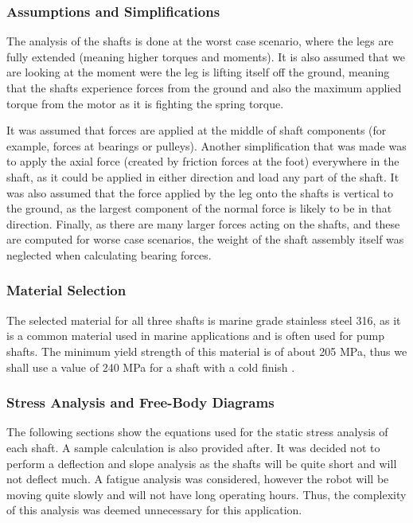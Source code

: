 \subsubsection{Assumptions and Simplifications}

The analysis of the shafts is done at the worst case scenario, where the legs are fully extended (meaning higher torques and moments). It is also assumed that we are looking at the moment were the leg is lifting itself off the ground, meaning that the shafts experience forces from the ground and also the maximum applied torque from the motor as it is fighting the spring torque.

It was assumed that forces are applied at the middle of shaft components (for example, forces at bearings or pulleys). 
Another simplification that was made was to apply the axial force (created by friction forces at the foot) everywhere in the shaft, as it could be applied in either direction and load any part of the shaft.
It was also assumed that the force applied by the leg onto the shafts is vertical to the ground, as the largest component of the normal force is likely to be in that direction.
Finally, as there are many larger forces acting on the shafts, and these are computed for worse case scenarios, the weight of the shaft assembly itself was neglected when calculating bearing forces.


\subsubsection{Material Selection}
The selected material for all three shafts is marine grade stainless steel 316, as it is a common material used in marine applications and is often used for pump shafts. The minimum yield strength of this material is of about 205 MPa, thus we shall use a value of 240 MPa for a shaft with a cold finish \cite{metal_supermarkets_marine_2017}.


\subsubsection{Stress Analysis and Free-Body Diagrams}
The following sections show the equations used for the static stress analysis of each shaft. A sample calculation is also provided after. It was decided not to perform a deflection and slope analysis as the shafts will be quite short and will not deflect much. A fatigue analysis was considered, however the robot will be moving quite slowly and will not have long operating hours. Thus, the complexity of this analysis was deemed unnecessary for this application.

